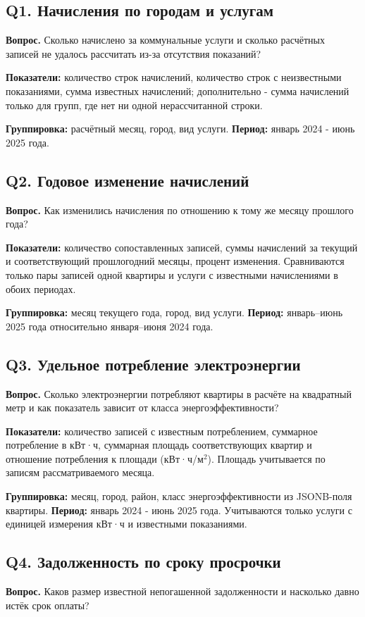 \documentclass[12pt]{article}
\begin{document}
\subsection{Q1. Начисления по городам и услугам}
\textbf{Вопрос.} Сколько начислено за коммунальные услуги и сколько расчётных записей не удалось рассчитать из-за отсутствия показаний?

\textbf{Показатели:} количество строк начислений, количество строк с неизвестными показаниями, сумма известных начислений; дополнительно - сумма начислений только для групп, где нет ни одной нерассчитанной строки.

\textbf{Группировка:} расчётный месяц, город, вид услуги. \textbf{Период:} январь 2024 - июнь 2025 года.

\subsection{Q2. Годовое изменение начислений}
\textbf{Вопрос.} Как изменились начисления по отношению к тому же месяцу прошлого года?

\textbf{Показатели:} количество сопоставленных записей, суммы начислений за текущий и соответствующий прошлогодний месяцы, процент изменения. Сравниваются только пары записей одной квартиры и услуги с известными начислениями в обоих периодах.

\textbf{Группировка:} месяц текущего года, город, вид услуги. \textbf{Период:} январь--июнь 2025 года относительно января--июня 2024 года.

\subsection{Q3. Удельное потребление электроэнергии}
\textbf{Вопрос.} Сколько электроэнергии потребляют квартиры в расчёте на квадратный метр и как показатель зависит от класса энергоэффективности?

\textbf{Показатели:} количество записей с известным потреблением, суммарное потребление в кВт·ч, суммарная площадь соответствующих квартир и отношение потребления к площади (кВт·ч/м$^2$). Площадь учитывается по записям рассматриваемого месяца.

\textbf{Группировка:} месяц, город, район, класс энергоэффективности из JSONB-поля квартиры. \textbf{Период:} январь 2024 - июнь 2025 года. Учитываются только услуги с единицей измерения кВт·ч и известными показаниями.

\subsection{Q4. Задолженность по сроку просрочки}
\textbf{Вопрос.} Каков размер известной непогашенной задолженности и насколько давно истёк срок оплаты?
\end{document}
